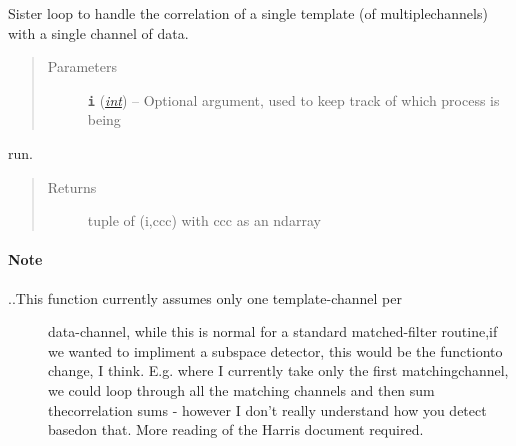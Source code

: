 \documentclass[a4paper,10pt,english]{sphinxmanual}
\begin{document}
\begin{fulllineitems}
\label{submodules/core.match_filter:match_filter._template_loop}
Sister loop to handle the correlation of a single template (of multiplechannels) with a single channel of data.
\begin{quote}\begin{description}
\item[{Parameters}] \leavevmode
\textbf{\texttt{i}} (\href{https://docs.python.org/library/functions.html\#int}{\emph{int}}) -- Optional argument, used to keep track of which process is being

\end{description}\end{quote}

run.
\begin{quote}\begin{description}
\item[{Returns}] \leavevmode
tuple of (i,ccc) with ccc as an ndarray

\end{description}\end{quote}
\paragraph{Note}
\begin{description}
\item[{..This function currently assumes only one template-channel per}] \leavevmode
data-channel, while this is normal for a standard matched-filter routine,if we wanted to impliment a subspace detector, this would be the functionto change, I think.  E.g. where I currently take only the first matchingchannel, we could loop through all the matching channels and then sum thecorrelation sums - however I don't really understand how you detect basedon that.  More reading of the Harris document required.

\end{description}

\end{fulllineitems}

\end{document}
